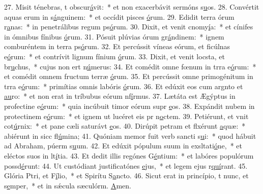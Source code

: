 27. Misit ténebras, t obscur\uline{á}vit:~* et non exacerbávit sermóns s\uline{u}os.
28. Convértit aquas erum in s\uline{á}nguinem:~* et occídit pisces \uline{ó}rum.
29. Edidit terra órum r\uline{a}nas:~* in penetrálibus regum ps\uline{ó}rum.
30. Dixit, et venit cnomy\uline{í}a:~* et cínifes in ómnibus fínibus \uline{ó}rum.
31. Pósuit plúvias órum gr\uline{á}ndinem:~* ignem comburéntem in terra ps\uline{ó}rum.
32. Et percússit víneas eórum, et ficúlnas e\uline{ó}rum:~* et contrívit lignum fínium \uline{ó}rum.
33. Dixit, et venit locsta, et br\uline{u}chus,~* cujus non ert n\uline{ú}merus:
34. Et comédit omne fœnum in trra e\uline{ó}rum:~* et comédit omnem fructum terræ \uline{ó}rum.
35. Et percússit omne primogénitum in trra e\uline{ó}rum:~* primítias omnis labóris \uline{ó}rum.
36. Et edúxit eos cum argnto et \uline{au}ro:~* et non erat in tríbubus eórum nf\uline{í}rmus.
37. Lætáta est Ægýptus in profectine e\uline{ó}rum:~* quia incúbuit timor eórum supr \uline{e}os.
38. Expándit nubem in protectinem e\uline{ó}rum:~* et ignem ut lucéret eis pr n\uline{o}ctem.
39. Petiérunt, et vnit cot\uline{ú}rnix:~* et pane cæli saturávt \uline{e}os.
40. Dirúpit petram et flxérunt \uline{a}quæ:~* abiérunt in sicc fl\uline{ú}mina;
41. Quóniam memor fuit verb sancti s\uline{u}i:~* quod hábuit ad Abraham, púerm s\uline{u}um.
42. Et edúxit pópulum suum in exsltati\uline{ó}ne,~* et eléctos suos in lt\uline{í}tia.
43. Et dedit illis regónes G\uline{é}ntium:~* et labóres populórum possd\uline{é}runt:
44. Ut custódiant justificatónes \uline{e}jus,~* et legem ejus r\uline{quí}rant.
45. Glória Ptri, et F\uline{í}lio,~* et Spirítu S\uline{a}ncto.
46. Sicut erat in princípio, t nunc, et s\uline{e}mper,~* et in sǽcula sæculórm. \uline{A}men.
